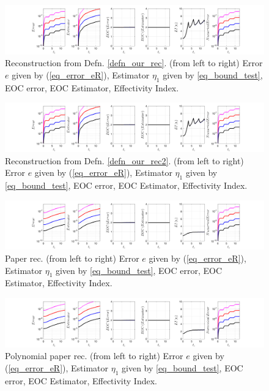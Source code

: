 \documentclass[12pt,a4paper]{article}
\numberwithin{equation}{section}
\theoremstyle{definition}
\begin{document}
\begin{figure}[H]
	\hspace{-3cm}
	\includegraphics[scale=0.55]{fig_LeapFrogplots_1x5_sin_IC_harmonic_order_2_u1_v9_rec_george}	
	\caption{Reconstruction from Defn. \ref{defn_our_rec}. (from left to right) Error $e$ given by (\ref{eq_error_eR}), Estimator $\eta_1$ given by \ref{eq_bound_test},  EOC error, EOC Estimator, Effectivity Index.}
	\label{fig_all_in_one_our_rec_george_u1_v9}
\end{figure}

\begin{figure}[H]
	\hspace{-3cm}
	\includegraphics[scale=0.55]{fig_LeapFrogplots_1x5_sin_IC_harmonic_order_2_u1_v9_rec2}	
	\caption{Reconstruction from Defn. \ref{defn_our_rec2}. (from left to right) Error $e$ given by (\ref{eq_error_eR}), Estimator $\eta_1$ given by \ref{eq_bound_test},  EOC error, EOC Estimator, Effectivity Index.}
	\label{fig_all_in_one_our_rec_2_u1_v9}
\end{figure}
\begin{figure}[H]
	\hspace{-3cm}
	\includegraphics[scale=0.55]{fig_LeapFrogplots_1x5_sin_IC_harmonic_u1_v9_paperrec}	
	\caption{Paper rec. (from left to right) Error $e$ given by (\ref{eq_error_eR}), Estimator $\eta_1$ given by \ref{eq_bound_test},  EOC error, EOC Estimator, Effectivity Index.}
	\label{fig_all_in_one_paperrec_u01_v09}
\end{figure}

\begin{figure}[H]
	\hspace{-3cm}
	\includegraphics[scale=0.55]{fig_LeapFrogplots_1x5_sin_IC_harmonic_u1_v9_paperrec_poly}	
	\caption{Polynomial paper rec. (from left to right) Error $e$ given by (\ref{eq_error_eR}), Estimator $\eta_1$ given by \ref{eq_bound_test},  EOC error, EOC Estimator, Effectivity Index.}
	\label{fig_all_in_one_paperrec_poly_u01_v09}
\end{figure}
\end{document}
